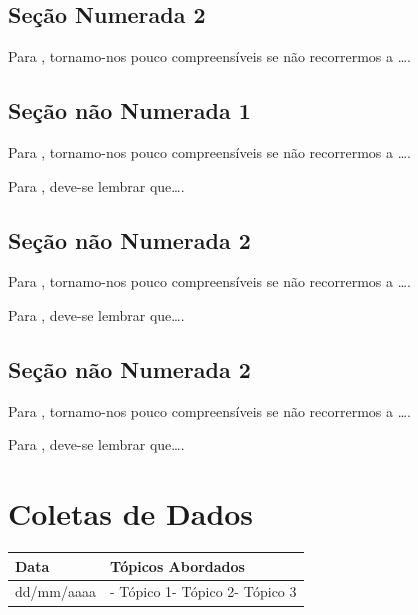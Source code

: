 \documentclass[
]{book}
\begin{document}
\hypertarget{seuxe7uxe3o-numerada-2-27}{%
\subsection{Seção Numerada 2}\label{seuxe7uxe3o-numerada-2-27}}

Para \citet{BOCK2001}, tornamo-nos pouco compreensíveis se não recorrermos a \ldots.

\hypertarget{seuxe7uxe3o-nuxe3o-numerada-1-55}{%
\subsection*{Seção não Numerada 1}\label{seuxe7uxe3o-nuxe3o-numerada-1-55}}

Para \citet{BOCK2001}, tornamo-nos pouco compreensíveis se não recorrermos a \ldots.

Para \citet{DAVIDOFF2001}, deve-se lembrar que\ldots.

\hypertarget{seuxe7uxe3o-nuxe3o-numerada-2-82}{%
\subsection*{Seção não Numerada 2}\label{seuxe7uxe3o-nuxe3o-numerada-2-82}}

Para \citet{BOCK2001}, tornamo-nos pouco compreensíveis se não recorrermos a \ldots.

Para \citet{DAVIDOFF2001}, deve-se lembrar que\ldots.

\hypertarget{seuxe7uxe3o-nuxe3o-numerada-2-83}{%
\subsection*{Seção não Numerada 2}\label{seuxe7uxe3o-nuxe3o-numerada-2-83}}

Para \citet{BOCK2001}, tornamo-nos pouco compreensíveis se não recorrermos a \ldots.

Para \citet{DAVIDOFF2001}, deve-se lembrar que\ldots.

\hypertarget{coletas-de-dados-1}{%
\section{Coletas de Dados}\label{coletas-de-dados-1}}

\begin{longtable}[]{@{}ll@{}}
\toprule()
Data & Tópicos Abordados \\
\midrule()
\endhead
dd/mm/aaaa & - Tópico 1- Tópico 2- Tópico 3 \\
\bottomrule()
\end{longtable}
\end{document}
